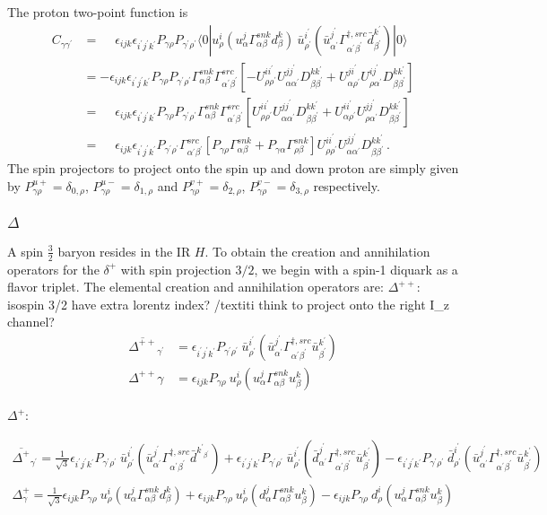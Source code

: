 \documentclass[prd,12pt,superscriptaddress,tightenlines,nofootinbib]{revtex4}
\def\a{{\alpha}}
\def\b{{\beta}}
\def\g{{\gamma}}
\def\G{{\Gamma}}
\def\ip{{i^\prime}}
\def\jp{{j^\prime}}
\def\kp{{k^\prime}}
\def\ap{{\alpha^\prime}}
\def\bp{{\beta^\prime}}
\def\gp{{\gamma^\prime}}
\def\rp{{\rho^\prime}}
\begin{document}
The proton two-point function is
\begin{align}
C_{\g\gp} &= \phantom{-}\epsilon_{ijk} \epsilon_{\ip\jp\kp} P_{\g\rho} P_{\gp\rp} \langle 0| 
	u^i_\rho (u^j_\a \G^{snk}_{\a\b} d^k_\b ) \ \bar{u}^\ip_\rp (\bar{u}^{\jp}_{\ap} \G^{\dagger,src}_{\ap\bp} \bar{d}^\kp_\bp ) 
	|0\rangle
\nonumber\\ &=
	-\epsilon_{ijk} \epsilon_{\ip\jp\kp} P_{\g\rho} P_{\gp\rp} \G^{snk}_{\a\b} \G^{src}_{\ap\bp}
	\left[ -U^{i\ip}_{\rho\rp} U^{j\jp}_{\a\ap} D^{k\kp}_{\b\bp} 
		+ U^{j\ip}_{\a\rp} U^{i\jp}_{\rho\ap} D^{k\kp}_{\b\bp} 
	\right]
\nonumber\\ &=
	\phantom{-}\epsilon_{ijk} \epsilon_{\ip\jp\kp} P_{\g\rho} P_{\gp\rp} \G^{snk}_{\a\b} \G^{src}_{\ap\bp} 
	\left[
		U^{i\ip}_{\rho\rp} U^{j\jp}_{\a\ap} D^{k\kp}_{\b\bp} 
		+U^{i\ip}_{\a\rp} U^{j\jp}_{\rho\ap} D^{k\kp}_{\b\bp} 
	\right]
\nonumber\\ &=
	\phantom{-}\epsilon_{ijk} \epsilon_{\ip\jp\kp}  P_{\gp\rp}  \G^{src}_{\ap\bp} 
	\left[
		P_{\g\rho} \G^{snk}_{\a\b} + P_{\g\a} \G^{snk}_{\rho\b}
	\right]
	U^{i\ip}_{\rho\rp} U^{j\jp}_{\a\ap} D^{k\kp}_{\b\bp} \, .
\end{align}
The spin projectors to project onto the spin up and down proton are simply given by $P^{u+}_{\g\rho} = \delta_{0,\rho}$, $P^{u-}_{\g\rho} = \delta_{1,\rho}$ and $P^{v+}_{\g\rho} = \delta_{2,\rho}$, $P^{v-}_{\g\rho} = \delta_{3,\rho}$ respectively.

\subsubsection*{$\Delta$}
A spin $\frac{3}{2}$ baryon resides in the IR $H$. 
To obtain the creation and annihilation operators for the $\delta^+$ with spin projection 
$3/2$, we begin with a spin-1 diquark as a flavor triplet. The elemental creation and annihilation operators are:
$\Delta^{++}$: 
isospin 3/2 have extra lorentz index? /textit{i think to project onto the right I_z channel}?
\begin{align}
	\overline{\Delta^{++}}_{\gp} &= \epsilon_{\ip\jp\kp} P_{\gp\rp}\ \bar{u}^\ip_\rp (\bar{u}^{\jp}_{\ap} \G^{\dagger,src}_{\ap\bp} \bar{u}^\kp_\bp ) 
	\\
	\Delta^{++}{\g} &= \epsilon_{ijk} P_{\g\rho}\ u^i_\rho (u^j_\a \G^{snk}_{\a\b} u^k_\b ) 
\end{align}

$\Delta^{+}$: 

\begin{gather}
\overline{\Delta^{+}}_{\gp} =  \frac{1}{\sqrt{3}}\epsilon_{\ip\jp\kp} P_{\gp\rp}\ \bar{u}^\ip_\rp (\bar{u}^{\jp}_{\ap} \G^{\dagger,src}_{\ap\bp} \bar{d}^{\kp_\bp} ) 
+ \epsilon_{\ip\jp\kp} P_{\gp\rp}\ \bar{u}^\ip_\rp (\bar{d}^{\jp}_{\ap} \G^{\dagger,src}_{\ap\bp} \bar{u}^\kp_\bp ) -
\epsilon_{\ip\jp\kp} P_{\gp\rp}\ \bar{d}^\ip_\rp (\bar{u}^{\jp}_{\ap} \G^{\dagger,src}_{\ap\bp} \bar{u}^\kp_\bp ) 
\\
\Delta^{+}_{\g} = \frac{1}{\sqrt{3}}\epsilon_{ijk} P_{\g\rho}\ u^i_\rho (u^j_\a \G^{snk}_{\a\b} d^k_\b ) +  \epsilon_{ijk} P_{\g\rho}\ u^i_\rho (d^j_\a \G^{snk}_{\a\b} u^k_\b ) - 
\epsilon_{ijk} P_{\g\rho}\ d^i_\rho (u^j_\a \G^{snk}_{\a\b} u^k_\b ) 
\end{gather}
\end{document}
